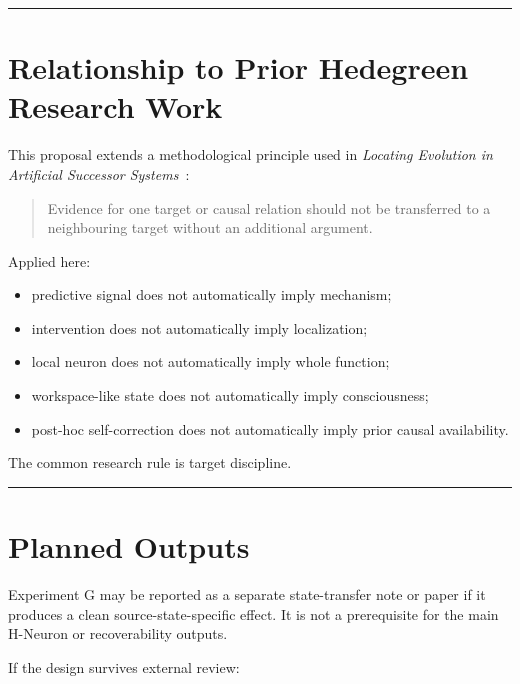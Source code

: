 \begin{center}\rule{0.5\linewidth}{0.5pt}\end{center}

\section{Relationship to Prior Hedegreen Research Work}\label{relationship-to-prior-hedegreen-research-work}

This proposal extends a methodological principle used in \emph{Locating Evolution in Artificial Successor Systems}~\parencite{hedegreen2026evolution}:

\begin{quote}
Evidence for one target or causal relation should not be transferred to a neighbouring target without an additional argument.
\end{quote}

Applied here:

\begin{itemize}
\tightlist
\item
  predictive signal does not automatically imply mechanism;
\item
  intervention does not automatically imply localization;
\item
  local neuron does not automatically imply whole function;
\item
  workspace-like state does not automatically imply consciousness;
\item
  post-hoc self-correction does not automatically imply prior causal availability.
\end{itemize}

The common research rule is target discipline.

\begin{center}\rule{0.5\linewidth}{0.5pt}\end{center}

\section{Planned Outputs}\label{planned-outputs}

Experiment G may be reported as a separate state-transfer note or paper if it produces a clean source-state-specific effect. It is not a prerequisite for the main H-Neuron or recoverability outputs.

If the design survives external review:

